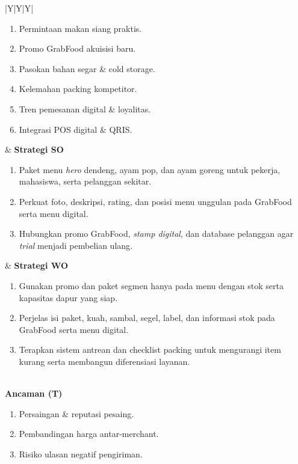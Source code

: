 \begin{xltabular}{\textwidth}{|Y|Y|Y|}
\begin{enumerate}[label=\textbf{O\arabic*.},leftmargin=1.5em,nosep,itemsep=0pt,topsep=1pt,parsep=0pt,partopsep=0pt]
            \item Permintaan makan siang praktis.
            \item Promo GrabFood akuisisi baru.
            \item Pasokan bahan segar \& cold storage.
            \item Kelemahan packing kompetitor.
            \item Tren pemesanan digital \& loyalitas.
            \item Integrasi POS digital \& QRIS.
        \end{enumerate} & \textbf{Strategi SO}
        \begin{enumerate}[label=\textbf{SO\arabic*.},leftmargin=1.7em,nosep,itemsep=0pt,topsep=1pt,parsep=0pt,partopsep=0pt]
            \item Paket menu \textit{hero} dendeng, ayam pop, dan ayam goreng untuk pekerja, mahasiswa, serta pelanggan sekitar.
            \item Perkuat foto, deskripsi, rating, dan posisi menu unggulan pada GrabFood serta menu digital.
            \item Hubungkan promo GrabFood, \textit{stamp digital}, dan database pelanggan agar \textit{trial} menjadi pembelian ulang.
        \end{enumerate} & \textbf{Strategi WO}
        \begin{enumerate}[label=\textbf{WO\arabic*.},leftmargin=1.7em,nosep,itemsep=0pt,topsep=1pt,parsep=0pt,partopsep=0pt]
            \item Gunakan promo dan paket segmen hanya pada menu dengan stok serta kapasitas dapur yang siap.
            \item Perjelas isi paket, kuah, sambal, segel, label, dan informasi stok pada GrabFood serta menu digital.
            \item Terapkan sistem antrean dan checklist packing untuk mengurangi item kurang serta membangun diferensiasi layanan.
        \end{enumerate} \\ \hline
        \textbf{Ancaman (T)}
        \begin{enumerate}[label=\textbf{T\arabic*.},leftmargin=1.5em,nosep,itemsep=0pt,topsep=1pt,parsep=0pt,partopsep=0pt]
            \item Persaingan \& reputasi pesaing.
            \item Pembandingan harga antar-merchant.
            \item Risiko ulasan negatif pengiriman.

\end{enumerate}
\end{xltabular}
